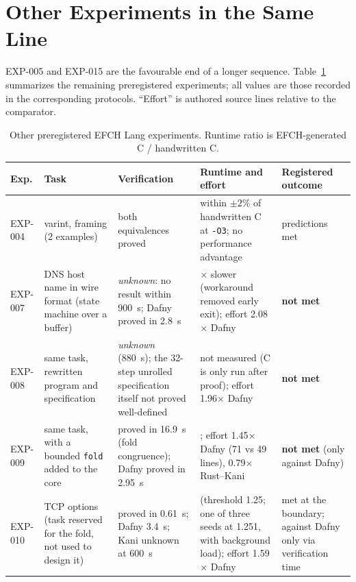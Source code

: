 \documentclass[10pt,twocolumn]{article}
\begin{document}
\section{Other Experiments in the Same Line}\label{sec:line}
EXP-005 and EXP-015 are the favourable end of a longer sequence. Table~\ref{tab:line} summarizes the remaining preregistered experiments; all values are those recorded in the corresponding protocols. ``Effort'' is authored source lines relative to the comparator.

\begin{table}[t]
\centering\small
\caption{Other preregistered EFCH Lang experiments. Runtime ratio is EFCH-generated C / handwritten C.}\label{tab:line}
\begin{tabularx}{\textwidth}{@{}l>{\raggedright\arraybackslash}p{}>{\raggedright\arraybackslash}X>{\raggedright\arraybackslash}X>{\raggedright\arraybackslash}p{}@{}}
\toprule
Exp. & Task & Verification & Runtime and effort & Registered outcome \\ \midrule
EXP-004 & varint, framing (2 examples) & both equivalences proved & within $\pm2\%$ of handwritten C at \texttt{-O3}; no performance advantage & predictions met \\
EXP-007 & DNS host name in wire format (state machine over a buffer) & \emph{unknown}: no result within 900~s; Dafny proved in 2.8~s & 5.6$\times$ slower (workaround removed early exit); effort 2.08$\times$ Dafny & \textbf{not met} \\
EXP-008 & same task, rewritten program and specification & \emph{unknown} (880~s); the 32-step unrolled specification itself not proved well-defined & not measured (C is only run after proof); effort 1.96$\times$ Dafny & \textbf{not met} \\
EXP-009 & same task, with a bounded \texttt{fold} added to the core & proved in 16.9~s (fold congruence); Dafny proved in 2.95~s & 1.02; effort 1.45$\times$ Dafny (71 vs 49 lines), 0.79$\times$ Rust--Kani & \textbf{not met} (only against Dafny) \\
EXP-010 & TCP options (task reserved for the fold, not used to design it) & proved in 0.61~s; Dafny 3.4~s; Kani unknown at 600~s & 1.21 (threshold 1.25; one of three seeds at 1.251, with background load); effort 1.59$\times$ Dafny & met at the boundary; against Dafny only via verification time \\
\bottomrule
\end{tabularx}
\end{table}
\end{document}
